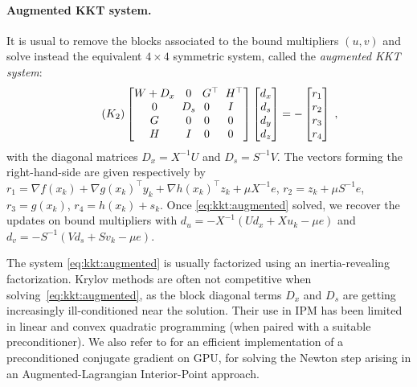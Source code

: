 \paragraph{Augmented KKT system.}
It is usual to remove the blocks associated
to the bound multipliers $(u, v)$ and solve instead the equivalent
$4 \times 4$ symmetric system, called the \emph{augmented KKT system}:
\begin{equation}
  \label{eq:kkt:augmented}
  \tag{$K_2$}
  \setlength\arraycolsep{3pt}
  \begin{bmatrix}
    W + D_x & 0   & G^\top           & H^\top           \\
    0       & D_s & 0\phantom{^\top} & I\phantom{^\top} \\
    G       & 0   & 0\phantom{^\top} & 0\phantom{^\top} \\
    H       & I   & 0\phantom{^\top} & 0\phantom{^\top}
  \end{bmatrix}
  \begin{bmatrix}
    d_x \\
    d_s \\
    d_y \\
    d_z
  \end{bmatrix}
  = - \begin{bmatrix}
    r_1 \\ r_2 \\ r_3 \\ r_4
  \end{bmatrix} \; ,
\end{equation}
with the diagonal matrices $D_x = X^{-1} U$ and $D_s = S^{-1} V$.
The vectors forming the right-hand-side are given respectively by
$r_1 = \nabla f(x_k) + \nabla g(x_k)^\top y_k + \nabla h(x_k)^\top z_k + \mu X^{-1} e$,
$r_2 = z_k + \mu S^{-1} e$,
$r_3 = g(x_k)$,
$r_4 = h(x_k) + s_k$.
Once \eqref{eq:kkt:augmented} solved, we recover the updates on bound multipliers with
$d_u = - X^{-1}(U d_x + X u_k - \mu e)$ and
$d_v = - S^{-1}(V d_s + S v_k - \mu e)$.

The system \eqref{eq:kkt:augmented} is usually factorized using
an inertia-revealing \lblt factorization.
Krylov methods are often not competitive when solving~\eqref{eq:kkt:augmented},
as the block diagonal terms $D_x$ and $D_s$ are getting increasingly
ill-conditioned near the solution. Their use in IPM has been limited in
linear and convex quadratic programming \cite{gondzio-2012} (when paired
with a suitable preconditioner). We also refer to \cite{cao-seth-laird-2016}
for an efficient implementation of a preconditioned conjugate gradient
on GPU, for solving the Newton step arising in an Augmented-Lagrangian Interior-Point
approach.

